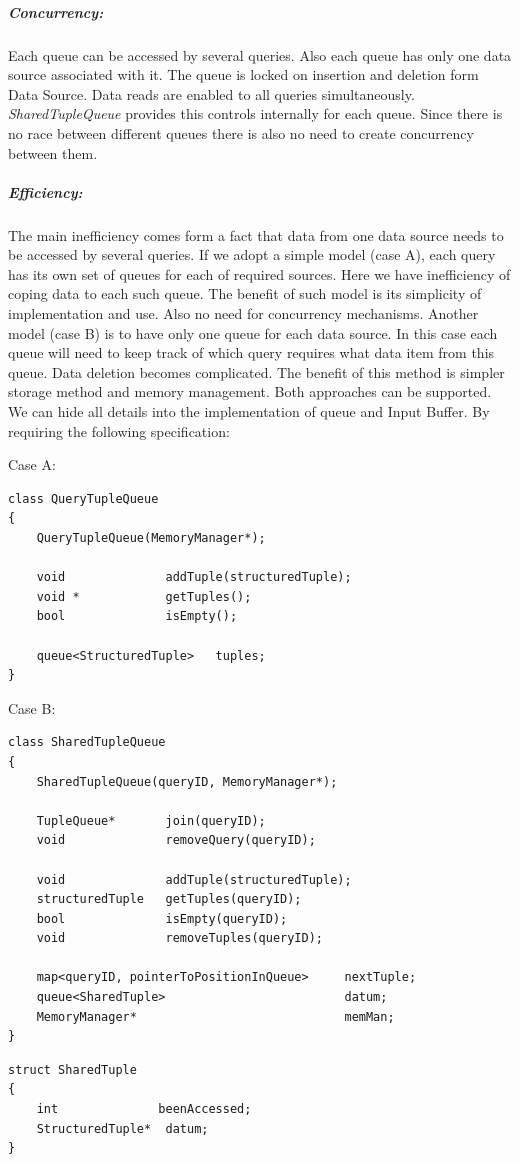\documentclass[14pt]{article}
\begin{document}
\subparagraph{Concurrency:} Each queue can be accessed by several queries. Also each queue has only one data source associated with it. The queue is locked on insertion and deletion form Data Source. Data reads are enabled to all queries simultaneously. \emph{SharedTupleQueue} provides this controls internally for each queue. Since there is no race between different queues there is also no need to create concurrency between them.

\subparagraph{Efficiency:} The main inefficiency comes form a fact that data from one data source needs to be accessed by several queries. If we adopt a simple model (case A), each query has its own set of queues for each of required sources. Here we have inefficiency of coping data to each such queue. The benefit of such model is its simplicity of implementation and use. Also no need for concurrency mechanisms. Another model (case B) is to have only one queue for each data source. In this case each queue will need to keep track of which query requires what data item from this queue. Data deletion becomes complicated. The benefit of this method is simpler storage method and memory management. Both approaches can be supported. We can hide all details into the implementation of queue and Input Buffer. By requiring the following specification:

\noindent Case A:
\begin{verbatim}
class QueryTupleQueue
{
    QueryTupleQueue(MemoryManager*);
	
	void              addTuple(structuredTuple);
	void *            getTuples();
	bool              isEmpty();

	queue<StructuredTuple>   tuples;
}
\end{verbatim}

\noindent Case B:
\begin{verbatim}
class SharedTupleQueue
{
    SharedTupleQueue(queryID, MemoryManager*);

	TupleQueue*       join(queryID);
	void              removeQuery(queryID);
	
	void              addTuple(structuredTuple);
	structuredTuple   getTuples(queryID);
	bool              isEmpty(queryID);
	void              removeTuples(queryID);
	
	map<queryID, pointerToPositionInQueue>     nextTuple;
	queue<SharedTuple>                         datum;
	MemoryManager*                             memMan;
}
\end{verbatim}

\begin{verbatim}
struct SharedTuple
{
    int              beenAccessed;
    StructuredTuple*  datum;
}
\end{verbatim}
\end{document}
